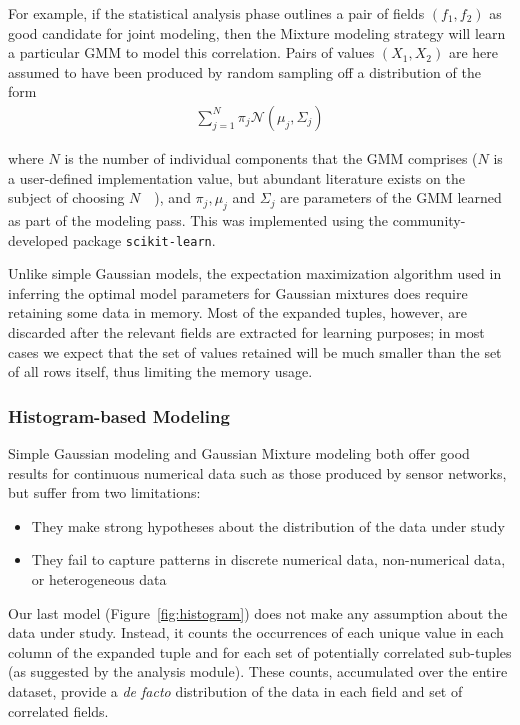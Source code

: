 For example, if the statistical analysis phase outlines a pair of fields $(f_1, f_2)$ as good candidate for joint modeling, then the Mixture modeling strategy will learn a particular GMM to model this correlation. Pairs of values $(X_1, X_2)$ are here assumed to have been produced by random sampling off a distribution of the form
\begin{align*}
\sum_{j=1}^{N} \pi_j \mathcal N(\mu_j, \Sigma_j)
\end{align*}

where $N$ is the number of individual components that the GMM comprises ($N$ is a user-defined implementation value, but abundant literature exists on the subject of choosing $N$~\cite{Schwartz1978}~\cite{Akaike1974}), and $\pi_j, \mu_j$ and $\Sigma_j$ are parameters of the GMM learned as part of the modeling pass. This was implemented using the community-developed package \texttt{scikit-learn}. 

Unlike simple Gaussian models, the expectation maximization algorithm used in inferring the optimal model parameters for Gaussian mixtures does require retaining some data in memory. Most of the expanded tuples, however, are discarded after the relevant fields are extracted for learning purposes; in most cases we expect that the set of values retained will be much smaller than the set of all rows itself, thus limiting the memory usage.

\subsubsection{Histogram-based Modeling}
Simple Gaussian modeling and Gaussian Mixture modeling both offer good results for continuous numerical data such as those produced by sensor networks, but suffer from two limitations:

\begin{itemize}
\item They make strong hypotheses about the distribution of the data under study
\item They fail to capture patterns in discrete numerical data, non-numerical data, or heterogeneous data
\end{itemize}

Our last model (Figure~\ref{fig:histogram}) does not make any assumption about the data under study. Instead, it counts the occurrences of each unique value in each column of the expanded tuple and for each set of potentially correlated sub-tuples (as suggested by the analysis module). These counts, accumulated over the entire dataset, provide a \emph{de facto} distribution of the data in each field and set of correlated fields. 


